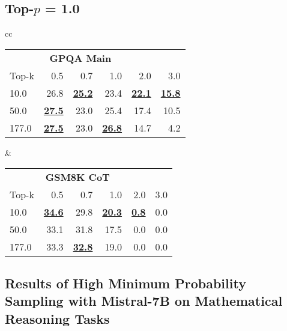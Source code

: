 \documentclass{article}
\begin{document}
\begin{table*}[ht]
\subsection*{Top-\(p\) = 1.0}
\begin{tabular}{cc}
\begin{tabular}{lrrrrr}
\toprule
\multicolumn{5}{c}{\textbf{GPQA Main}} \\
Top-k & 0.5 & 0.7 & 1.0 & 2.0 & 3.0 \\
\midrule
10.0 & 26.8 & \textbf{\underline{25.2}} & 23.4 & \textbf{\underline{22.1}} & \textbf{\underline{15.8}} \\
50.0 & \textbf{\underline{27.5}} & 23.0 & 25.4 & 17.4 & 10.5 \\
177.0 & \textbf{\underline{27.5}} & 23.0 & \textbf{\underline{26.8}} & 14.7 & 4.2 \\
\bottomrule
\end{tabular}
&
\begin{tabular}{lrrrrr}
\toprule
\multicolumn{5}{c}{\textbf{GSM8K CoT}} \\
Top-k & 0.5 & 0.7 & 1.0 & 2.0 & 3.0 \\
\midrule
10.0 & \textbf{\underline{34.6}} & 29.8 & \textbf{\underline{20.3}} & \textbf{\underline{0.8}} & 0.0 \\
50.0 & 33.1 & 31.8 & 17.5 & 0.0 & 0.0 \\
177.0 & 33.3 & \textbf{\underline{32.8}} & 19.0 & 0.0 & 0.0 \\
\bottomrule
\end{tabular}
\end{tabular}
\end{table*}

\clearpage  

\subsection{Results of High Minimum Probability Sampling with Mistral-7B on Mathematical Reasoning Tasks}
\end{document}
